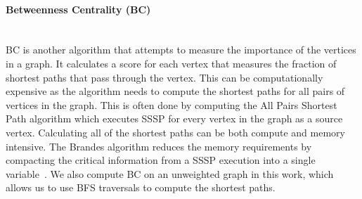 \paragraph{Betweenness Centrality (BC)}\mbox{}\\
BC is another algorithm that attempts to measure the importance of the vertices in a graph. 
It calculates a score for each vertex that measures the fraction of shortest paths that pass through the vertex.
This can be computationally expensive as the algorithm needs to compute the shortest paths for all pairs of vertices in the graph.
This is often done by computing the All Pairs Shortest Path algorithm which executes SSSP for every vertex in the graph as a source vertex. 
Calculating all of the shortest paths can be both compute and memory intensive. 
The Brandes algorithm reduces the memory requirements by compacting the critical information from a SSSP execution into a single variable~\cite{brandes2001faster}.
We also compute BC on an unweighted graph in this work, which allows us to use BFS traversals to compute the shortest paths. 
